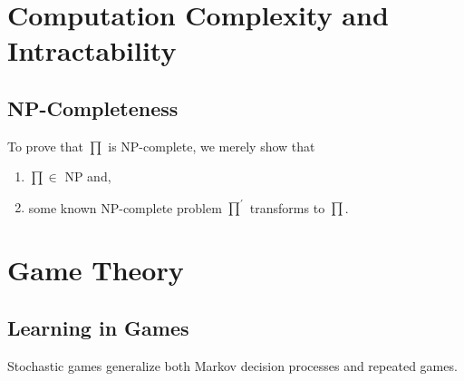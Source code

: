 \documentclass{article}
\begin{document}
\section{Computation Complexity and Intractability}

\subsection{NP-Completeness}

To prove that $\prod$ is NP-complete, we merely show that \cite{Garey:1990:CIG:574848}

\begin{enumerate}
\item $\prod \in$ NP and,
\item some known NP-complete problem $\prod^\prime$ transforms to $\prod$.
\end{enumerate}

\section{Game Theory}

\subsection{Learning in Games}
Stochastic games generalize both Markov decision processes and repeated games.



\end{document}

